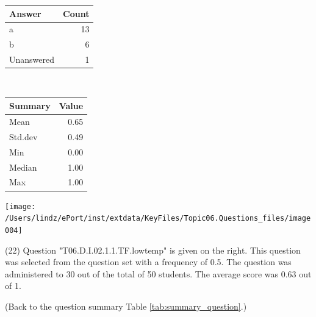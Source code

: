 \documentclass[12pt,english,nohyper]{tufte-handout}\usepackage[]{graphicx}\usepackage[]{color}
\begin{document}
\begin{center}%
\begin{tabular}{lr}
  \hline
Answer & Count \\ 
  \hline
a &  13 \\ 
  b &   6 \\ 
  Unanswered &   1 \\ 
   \hline
\end{tabular}
~~~~~~~~%
\begin{tabular}{lr}
  \hline
Summary & Value \\ 
  \hline
Mean & 0.65 \\ 
  Std.dev & 0.49 \\ 
  Min & 0.00 \\ 
  Median & 1.00 \\ 
  Max & 1.00 \\ 
   \hline
\end{tabular}
\end{center}\newpage{}



\vspace{5cm}\begin{marginfigure}\texttt{[image: /Users/lindz/ePort/inst/extdata/KeyFiles/Topic06.Questions\_files/image004]}\end{marginfigure}\vspace{-5cm} (22) Question "T06.D.I.02.1.1.TF.lowtemp" is given on the right. This question was selected from the question set with a frequency of 0.5. The question was administered to 30 out of the total of 50 students. The average score was 0.63 out of 1.

 (Back to the question summary Table \ref{tab:summary_question}.)
\end{document}
